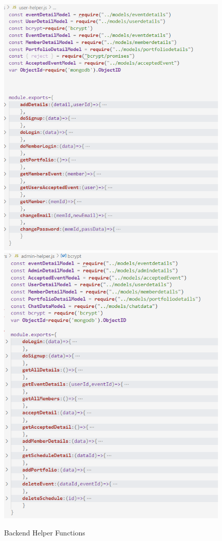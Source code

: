 \begin{figure}[H]
	\centering
	\includegraphics[scale=0.5]{helperfunctions1.png}
	\includegraphics[scale=0.5]{helperfunctions2.png}
	\caption{Backend Helper Functions }
	\label{Backend Helper Functions}
\end{figure}
